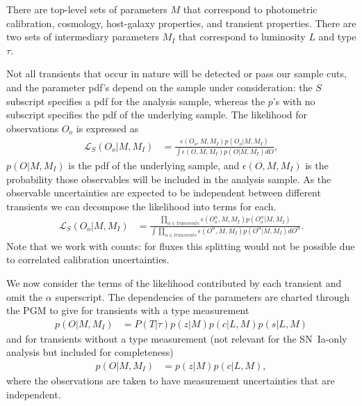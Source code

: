 \documentclass[preprint,3p]{elsarticle}
\begin{document}
There are top-level  sets of parameters $M$ that correspond to photometric calibration, cosmology,
host-galaxy properties, and transient properties.
There are two sets of intermediary parameters $M_I$ that correspond to luminosity $L$ and type $\tau$.

Not all transients that occur in nature will be detected or pass our sample cuts, and the parameter pdf's
depend on the sample under consideration: the $S$ subscript specifies a pdf for the analysis sample,
whereas the $p$'s with no subscript specifies the pdf of the underlying sample.
The likelihood for observations $O_o$ is expressed as
\begin{align*}
\mathcal{L}_S(O_o | M, M_I) & = \frac{\epsilon(O_o, M, M_I) p(O_o|M, M_I)}{\int  \epsilon(O, M, M_I) p(O|M, M_I)dO},
\end{align*}
$p(O|M, M_I)$ is the pdf of the underlying sample, and $\epsilon(O, M, M_I) $
is the probability those observables will be included in the analysis sample.
As the observable uncertainties
are expected to be independent between different transients we can decompose the likelihood into terms
for each.
\begin{align*}
\mathcal{L}_S(O_o | M, M_I) & = \frac{\prod_{\alpha \in transients} \epsilon(O_o^\alpha, M, M_I) p(O_o^\alpha|M, M_I)}{\int \prod_{\alpha \in transients}  \epsilon(O^\alpha, M, M_I) p(O^\alpha|M, M_I)dO^\alpha}.
\end{align*}
Note that we work with counts: for fluxes this splitting would not be possible due to correlated calibration uncertainties.

We now consider the terms of the likelihood contributed by each transient and omit the $\alpha$ superscript. 
The dependencies of the parameters are charted through the PGM to give for transients with a type measurement
\begin{align*}
p(O| M, M_I) & = P(T | \tau) p(z | M) p(c | L, M) p(s|L, M)
\end{align*}
and for transients without a type measurement (not relevant for the SN~Ia-only analysis but included for completeness)
\begin{align*}
p(O| M, M_I) & = p(z | M) p(c | L, M),
\end{align*}
where the observations are taken to have measurement uncertainties that are independent.  
\end{document}
